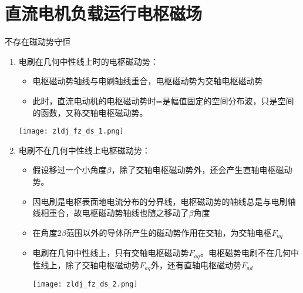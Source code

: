\documentclass[blue]{elegantnote}
\begin{document}
\section{直流电机负载运行电枢磁场}
不存在磁动势守恒
\begin{enumerate}
	\item 电刷在几何中性线上时的电枢磁动势：
	\begin{itemize}
		\item 	电枢磁动势轴线与电刷轴线重合，电枢磁动势为交轴电枢磁动势
		\item 	此时，直流电动机的电枢磁动势时=是幅值固定的空间分布波，只是空间的函数，又称交轴电枢磁动势。
	\end{itemize}
	\begin{center}
		\texttt{[image: zldj\_fz\_ds\_1.png]}
	\end{center}
	\item 	电刷不在几何中性线上电枢磁动势：
	\begin{itemize}
		\item 假设移过一个小角度$\beta$，除了交轴电枢磁动势外，还会产生直轴电枢磁动势。
		\item 因{\color{red}电刷是电枢表面地电流分布的分界线}，电枢磁动势的轴线总是与电刷轴线相重合，故电枢磁动势轴线也随之移动了$\beta$角度
		\item 在角度$2\beta$范围以外的导体所产生的磁动势作用在交轴，为交轴电枢$F_{aq}$
		\item 电刷在几何中性线上，只有交轴电枢磁动势$F_{aq}$。电枢磁势电刷不在几何中性线上，除了交轴电枢磁动势$F_{aq}$外，还有直轴电枢磁动势$F_{ad}$
	\begin{center}
		\texttt{[image: zldj\_fz\_ds\_2.png]}
	\end{center}		
	\end{itemize}
\end{enumerate}
\end{document}
